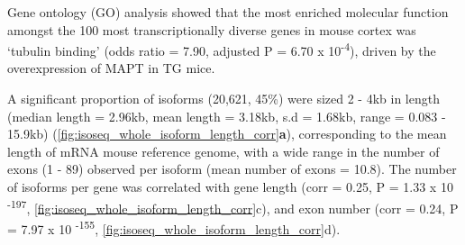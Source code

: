 Gene ontology (GO) analysis showed that the most enriched molecular function amongst the 100 most transcriptionally diverse genes in mouse cortex was ‘tubulin binding’ (odds ratio = 7.90, adjusted P =  6.70 x 10\textsuperscript{-4}), driven by the overexpression of MAPT in TG mice.
   
A significant proportion of isoforms (20,621, 45\%) were sized 2 - 4kb in length (median length = 2.96kb, mean length = 3.18kb, s.d = 1.68kb, range = 0.083 - 15.9kb) (\cref{fig:isoseq_whole_isoform_length_corr}\textbf{a}), corresponding to the mean length of mRNA mouse reference genome, with a wide range in the number of exons (1 - 89) observed per isoform (mean number of exons = 10.8). The number of isoforms per gene was correlated with gene length (corr = 0.25, P = 1.33 x 10 \textsuperscript{-197}, \cref{fig:isoseq_whole_isoform_length_corr}{c}), and exon number (corr = 0.24, P = 7.97 x 10 \textsuperscript{-155}, \cref{fig:isoseq_whole_isoform_length_corr}{d}). 

